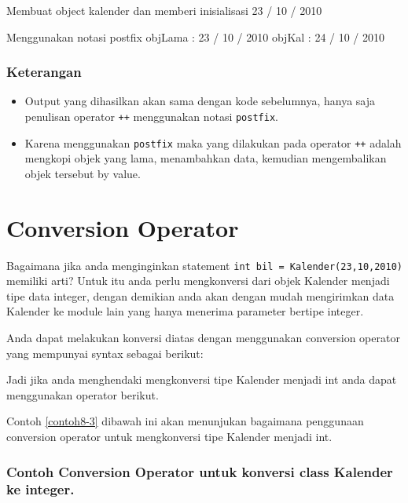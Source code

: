 \begin{lcverbatim}
Membuat object kalender dan memberi inisialisasi
23 / 10 / 2010

Menggunakan notasi postfix
objLama : 23 / 10 / 2010
objKal : 24 / 10 / 2010
\end{lcverbatim}

\subsubsection*{Keterangan}

\begin{itemize}

\item
 Output yang dihasilkan akan sama dengan kode sebelumnya, hanya saja
 penulisan operator \texttt{++} menggunakan notasi \texttt{postfix}.
\item
 Karena menggunakan \texttt{postfix} maka yang dilakukan pada operator
 \texttt{++} adalah mengkopi objek yang lama, menambahkan data,
 kemudian mengembalikan objek tersebut by value.
\end{itemize}

\section{Conversion Operator}\label{conversion-operator}

Bagaimana jika anda menginginkan statement
\texttt{int\ bil\ =\ Kalender(23,10,2010)} memiliki arti? Untuk itu anda
perlu mengkonversi dari objek Kalender menjadi tipe data integer, dengan
demikian anda akan dengan mudah mengirimkan data Kalender ke module lain
yang hanya menerima parameter bertipe integer.

Anda dapat melakukan konversi diatas dengan menggunakan conversion
operator yang mempunyai syntax sebagai berikut:



Jadi jika anda menghendaki mengkonversi tipe Kalender menjadi int anda
dapat menggunakan operator berikut.



Contoh \ref{contoh8-3} dibawah ini akan menunjukan bagaimana penggunaan conversion
operator untuk mengkonversi tipe Kalender menjadi int.

\subsubsection*{Contoh Conversion Operator untuk konversi class Kalender ke integer.}

